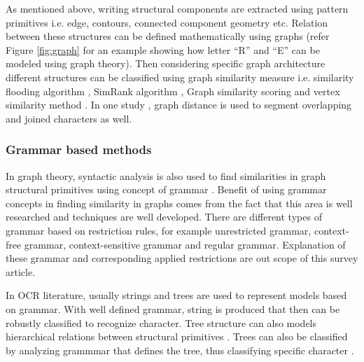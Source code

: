 \documentclass{article}
\begin{document}
As mentioned above, writing structural components are extracted using pattern primitives i.e. edge, contours, connected component geometry etc. Relation between these structures can be defined mathematically using graphs (refer Figure \ref{fig:graph} for an example showing how letter ``R'' and ``E'' can be modeled using graph theory). Then considering specific graph architecture different structures can be classified using graph similarity measure i.e. similarity flooding algorithm \cite{994702}, SimRank algorithm \cite{Jeh:2002}, Graph similarity scoring \cite{ZAGER200886} and vertex similarity method \cite{Leicht2006}. In one study \cite{8263187}, graph distance is used to segment overlapping and joined characters as well.   















\subsubsection{Grammar based methods}

In graph theory, syntactic analysis is also used to find similarities in graph structural primitives using concept of grammar \cite{grammar}. Benefit of using grammar concepts in finding similarity in graphs comes from the fact that this area is well researched and techniques are well developed.  There are different types of grammar based on restriction rules, for example unrestricted grammar, context-free grammar, context-sensitive grammar and regular grammar. Explanation of these grammar and corresponding applied restrictions are out scope of this survey article. 

In OCR literature, usually strings and trees are used to represent models based on grammar.  With well defined grammar, string is produced that then can be robustly classified to recognize character. Tree structure can also models hierarchical relations between structural primitives \cite{pal2012handwriting}. Trees can also be classified by analyzing grammmar that defines the tree, thus classifying specific character \cite{Chaudhuri2017}. 
\end{document}
